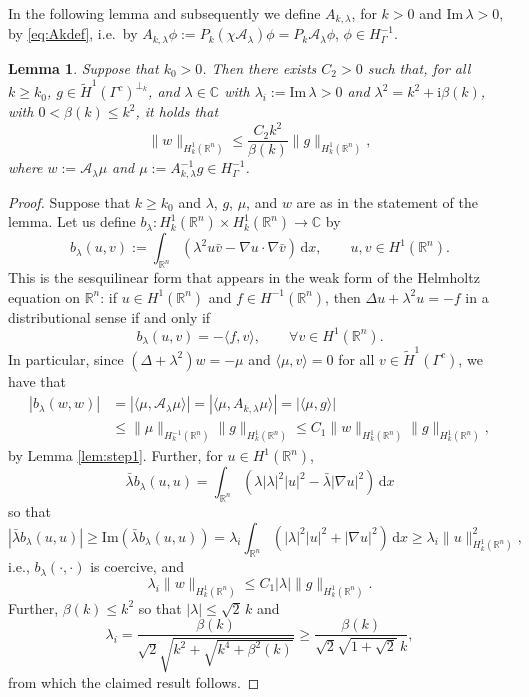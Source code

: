 \documentclass{birkjour}
\newtheorem{lemma}[theorem]{Lemma}
\theoremstyle{definition}
\theoremstyle{remark}
\numberwithin{equation}{section}
\newcommand{\R}{\mathbb{R}}
\newcommand{\C}{\mathbb{C}}
\newcommand{\ri}{\mathrm{i}}
\newcommand{\cA}{\mathcal{A}}
\newcommand{\rd}{\mathrm{d}}
\begin{document}
In the following lemma and subsequently we define $A_{k,\lambda}$, for $k>0$ and $\mathrm{Im}\, \lambda>0$, by \eqref{eq:Akdef}, i.e.\ by $A_{k,\lambda}\phi := P_k(\chi \cA_\lambda)\phi = P_k\cA_\lambda \phi$, $\phi\in H_\Gamma^{-1}$.
\begin{lemma} \label{lem:step2} Suppose that  $k_0>0$. Then  there exists $C_2>0$ such that, for all  $k\geq k_0$, $g\in \widetilde H^1(\Gamma^c)^{\perp_k}$, and 
$\lambda\in \C$ with $\lambda_i := \mathrm{Im}\, \lambda >0$ and $\lambda^2=k^2+\ri \beta(k)$, with $0<\beta(k)\leq k^2$,  it holds that
$$
\|w\|_{H^1_k(\R^n)} \leq \frac{C_2k^2}{\beta(k)} \|g\|_{H^1_k(\R^n)},
$$ 
where $w:= \cA_\lambda \mu$ and $\mu:= A_{k,\lambda}^{-1}g\in H^{-1}_\Gamma$.
\end{lemma}
\begin{proof} Suppose that $k\geq k_0$ and $\lambda$, $g$, $\mu$, and $w$ are as in the statement of the lemma. Let us define $b_\lambda: H_k^1(\mathbb{R}^n)\times H_k^1(\mathbb{R}^n)\rightarrow\mathbb{C}$ by
\begin{equation*}
 b_\lambda(u,v):=\int_{\R^n}\left(\lambda^2 u \bar v - \nabla u\cdot \nabla \bar v\right)\, \rd x, \qquad u,v \in H^1(\R^n).
\end{equation*}
This is the sesquilinear form that appears in the weak form of the Helmholtz equation on $\R^n$: 
if $u\in H^1(\R^n)$ and $f\in H^{-1}(\R^n)$, then $\Delta u + \lambda^2 u = -f$ in a distributional sense if and only if
$$
b_\lambda(u,v) = -\langle f,v\rangle, \qquad \forall v\in H^1(\R^n).
$$
In particular, since $(\Delta + \lambda^2)w = - \mu$ and $\langle \mu, v\rangle =0$ for all $v\in \widetilde H^1(\Gamma^c)$, we have that
\begin{align*}
|b_\lambda(w,w)| & = |\langle \mu,\cA_\lambda \mu\rangle| = |\langle \mu, A_{k,\lambda} \mu\rangle|=|\langle \mu,g\rangle|\\ & \leq \|\mu\|_{H_k^{-1}(\R^n)} \|g\|_{H^1_k(\R^n)} \leq C_1\|w\|_{H_k^{1}(\R^n)} \|g\|_{H^1_k(\R^n)},
\end{align*}
by Lemma \ref{lem:step1}. Further, for $u\in H^1(\R^n)$,
$$
\bar \lambda b_\lambda(u,u) = \int_{\R^n}\left(\lambda |\lambda|^2 |u|^2  - \bar\lambda |\nabla u|^2\right)\, \rd x
$$
so that
$$
|\bar \lambda b_\lambda(u,u)| \geq \mathrm{Im}( \bar \lambda b_\lambda(u,u)) = \lambda_i \int_{\R^n}\left(|\lambda|^2 |u|^2  + |\nabla u|^2\right)\, \rd x \geq \lambda_i \|u\|_{H^1_k(\R^n)}^2,
$$
i.e., $b_\lambda(\cdot,\cdot)$ is coercive, and
$$
\lambda_i \|w\|_{H_k^{1}(\R^n)} \leq C_1|\lambda| \|g\|_{H^1_k(\R^n)}.
$$
Further, $\beta(k)\leq k^2$ so that $|\lambda| \leq \sqrt{2}\,k$ and
$$
\lambda_i = \frac{\beta(k)}{\sqrt{2}\sqrt{k^2+\sqrt{k^4+\beta^2(k)}}}\geq \frac{\beta(k)}{\sqrt{2}\sqrt{1+\sqrt{2}}\,k},
$$
from which the claimed result follows.
\end{proof}
\end{document}
